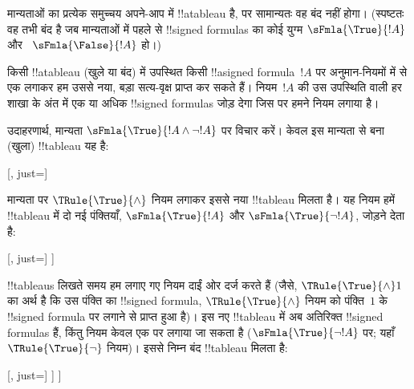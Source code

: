 \documentclass[../../../include/open-logic-section]{subfiles}
\begin{document}
\begin{ex}
  मान्यताओं का प्रत्येक समुच्चय अपने-आप में !!a{tableau} है, पर सामान्यतः
  वह बंद नहीं होगा। (स्पष्टतः वह तभी बंद है जब मान्यताओं में पहले से
  !!{signed formula}s का कोई युग्म $\sFmla{\True}{!A}$ और
  ~$\sFmla{\False}{!A}$ हो।)

  किसी !!a{tableau} (खुले या बंद) में उपस्थित किसी
  !!a{signed formula}~$!A$ पर अनुमान-नियमों में से एक लगाकर हम उससे नया,
  बड़ा सत्य-वृक्ष प्राप्त कर सकते हैं। नियम~$!A$ की उस उपस्थिति वाली हर
  शाखा के अंत में एक या अधिक !!{signed formula}s जोड़ देगा जिस पर हमने
  नियम लगाया है।

  उदाहरणार्थ, मान्यता $\sFmla{\True}{!A \land \lnot
    !A}$ पर विचार करें।
  केवल इस मान्यता से बना (खुला) !!{tableau} यह है:
  \begin{center}
    \begin{tableau}{}
      [, just=\TAss]
    \end{tableau}{}
  \end{center}
  मान्यता पर $\TRule{\True}{\land}$ नियम लगाकर इससे नया !!{tableau}
  मिलता है। यह नियम हमें !!{tableau} में दो नई पंक्तियाँ,
  $\sFmla{\True}{!A}$ और $\sFmla{\True}{\lnot !A}$, जोड़ने देता है:
  \begin{center}
    \begin{tableau}{}
      [, just=\TAss
        [\sFmla{\True}{\formula{A}}, just={\TRule{\True}{\land}[1]},
          [\sFmla{\True}{\lnot \formula{A}}, just={\TRule{\True}{\land}[1]}
          ]
        ]
      ]
    \end{tableau}{}
  \end{center}
  !!{tableau}s लिखते समय हम लगाए गए नियम दाईं ओर दर्ज करते हैं (जैसे,
  $\TRule{\True}{\land} 1$ का अर्थ है कि उस पंक्ति का !!{signed formula},
  $\TRule{\True}{\land}$ नियम को पंक्ति~$1$ के !!{signed formula} पर लगाने
  से प्राप्त हुआ है)। इस नए !!{tableau} में अब अतिरिक्त !!{signed formula}s
  हैं, किंतु नियम केवल एक पर लगाया जा सकता है
  ($\sFmla{\True}{\lnot !A}$ पर; यहाँ $\TRule{\True}{\lnot}$ नियम)। इससे
  निम्न बंद !!{tableau} मिलता है:
  \begin{center}
    \begin{tableau}{}
      [, just=\TAss
        [\sFmla{\True}{\formula{A}}, just={\TRule{\True}{\land}[1]}
          [\sFmla{\True}{\lnot \formula{A}}, just={\TRule{\True}{\land}[1]}
            [\sFmla{\False}{\formula{A}}, just={\TRule{\True}{\lnot}[3]}, close]
          ]
        ]
      ]
    \end{tableau}{}
  \end{center}
\end{ex}
\end{document}

